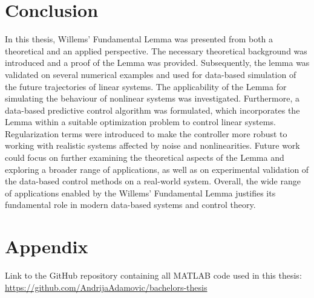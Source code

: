 \documentclass[12pt,a4paper]{report}
\begin{document}

\chapter{Conclusion}

In this thesis, Willems' Fundamental Lemma was presented from both a theoretical and an applied perspective. The necessary theoretical
background was introduced and a proof of the Lemma was provided. Subsequently, the lemma was validated on several numerical examples and used for data-based simulation of the future trajectories of linear systems.
The applicability of the Lemma for simulating the behaviour of nonlinear systems was investigated.
Furthermore, a data-based predictive control algorithm was formulated, which incorporates the Lemma within a suitable optimization problem to control linear systems. Regularization terms were introduced to make the
controller more robust to working with realistic systems affected by noise and nonlinearities. Future work could focus on further examining the theoretical aspects of the Lemma and exploring a broader range of applications, 
as well as on experimental validation of the data-based control methods on a real-world system. 
Overall, the wide range of applications enabled by the Willems' Fundamental Lemma justifies its fundamental role in modern data-based systems and control theory.

\appendix
\chapter{Appendix}

Link to the GitHub repository containing all MATLAB code used in this thesis:  \\ \url{https://github.com/AndrijaAdamovic/bachelors-thesis}

\clearpage
{}

\nocite{*}

\end{document}

